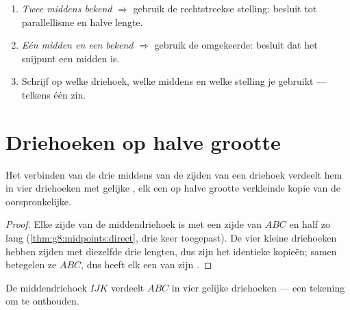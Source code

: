 \begin{method}\label{met:g8:midpoints:choose}
\begin{enumerate}
  \item \emph{Twee middens bekend} $\Rightarrow$ gebruik de rechtstreekse
        stelling: besluit tot parallellisme en halve lengte.
  \item \emph{Eén midden en een  bekend} $\Rightarrow$ gebruik de
        omgekeerde: besluit dat het snijpunt een midden is.
  \item Schrijf op welke driehoek, welke middens en welke stelling je gebruikt
        --- telkens één zin.
\end{enumerate}
\end{method}

\section{Driehoeken op halve grootte}

\begin{proposition}[De middendriehoek]\label{prop:g8:midpoints:medial}
Het verbinden van de drie middens van de zijden van een driehoek verdeelt hem in
vier driehoeken met gelijke , elk een op halve grootte verkleinde
kopie van de oorspronkelijke.
\end{proposition}

\begin{proof}
Elke zijde van de middendriehoek is  met een zijde van $ABC$ en half zo
lang (\cref{thm:g8:midpoints:direct}, drie keer toegepast). De vier kleine
driehoeken hebben zijden met diezelfde drie lengten, dus zijn het identieke
kopieën; samen betegelen ze $ABC$, dus heeft elk een  van zijn .
\end{proof}

\begin{omfigure}

{\small De middendriehoek $IJK$ verdeelt $ABC$ in vier gelijke driehoeken --- een
tekening om te onthouden.}
\end{omfigure}

